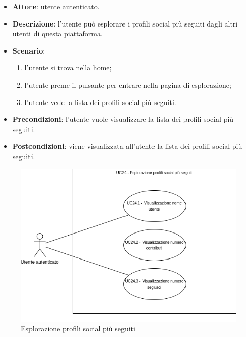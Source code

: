 \begin{itemize}
    \item \textbf{Attore}: utente autenticato.
    \item \textbf{Descrizione}: l'utente può esplorare i profili social più seguiti dagli altri utenti di questa piattaforma.
    \item \textbf{Scenario}:
    \begin{enumerate}
        \item l'utente si trova nella home;
        \item l'utente preme il pulsante per entrare nella pagina di esplorazione;
        \item l'utente vede la lista dei profili social più seguiti.
    \end{enumerate}
    \item \textbf{Precondizioni}: l'utente vuole visualizzare la lista dei profili social più seguiti.
    \item \textbf{Postcondizioni}: viene visualizzata all'utente la lista dei profili social più seguiti.
\end{itemize}

\begin{figure}[H]
    \includegraphics[width=13cm]{sezioni/Images/UC24_s.png}
    \centering
    \caption{Esplorazione profili social più seguiti}
\end{figure}


